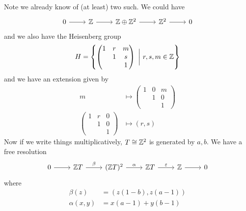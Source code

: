 \documentclass{article}
\begin{document}
\begin{example}
     Note we already know of (at least) two such. We could have
    \[\begin{tikzcd}
        0 & \Z & {\Z \oplus \Z^2} & {\Z^2} & 0
        \arrow[from=1-1, to=1-2]
        \arrow[from=1-2, to=1-3]
        \arrow[from=1-3, to=1-4]
        \arrow[from=1-4, to=1-5]
    \end{tikzcd}\]
    and we also have the Heisenberg group
    \[H = \left\{\begin{pmatrix}
        1 & r & m \\
        & 1 & s \\
        & & 1
    \end{pmatrix}\ \bigg\vert\ r, s, m \in \mathbb{Z}\right\}\]
    and we have an extension given by
    \begin{align*}
        m &\mapsto \begin{pmatrix}
            1 & 0 & m \\
            & 1 & 0 \\
            & & 1
        \end{pmatrix} \\
        \begin{pmatrix}
            1 & r & 0 \\
            & 1 & 0 \\
            & & 1
        \end{pmatrix} &\mapsto (r, s)
    \end{align*}
    Now if we write things multiplicatively, \(T \cong \mathbb{Z}^2\) is generated by \(a, b\). We have a free resolution
\[\begin{tikzcd}
	0 & {\Z T} & {(\Z T)^2} & {\Z T} & \Z & 0
	\arrow[from=1-1, to=1-2]
	\arrow["\beta", from=1-2, to=1-3]
	\arrow["\alpha", from=1-3, to=1-4]
	\arrow["\epsilon", from=1-4, to=1-5]
	\arrow[from=1-5, to=1-6]
\end{tikzcd}\]
    where
    \begin{align*}
        \beta(z) &= (z(1 - b), z(a - 1)) \\
        \alpha(x, y) &= x(a - 1) + y(b - 1)
    \end{align*}

\end{example}
\end{document}
